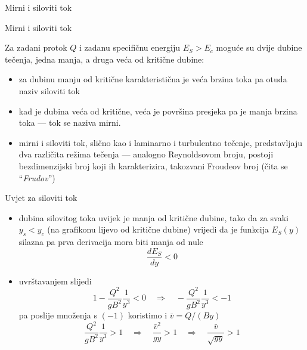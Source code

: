 \documentclass{beamer}
\begin{document}
\begin{frame}{Mirni i siloviti tok}

\begin{block}{Mirni i siloviti tok}

Za zadani protok $Q$ i zadanu specifičnu energiju $E_{S}>E_{c}$
moguće su dvije dubine tečenja, jedna manja, a druga veća od kritične
dubine:

\begin{itemize}
\item za dubinu manju od kritične karakteristična je veća brzina toka pa
otuda naziv \alert{siloviti tok}
\item kad je dubina veća od kritične, veća je površina presjeka pa je manja
brzina toka --- tok se naziva \alert{mirni}.
\end{itemize}
\end{block}
\begin{itemize}
\item mirni i siloviti tok, slično kao i laminarno i turbulentno tečenje,
predstavljaju dva različita režima tečenja --- analogno Reynoldsovom
broju, postoji bezdimenzijski broj koji ih karakterizira, takozvani
\alert{Froudeov broj} (čita se ``\emph{Frudov}'')
\end{itemize}
\end{frame}

\begin{frame}{Uvjet za siloviti tok}

\begin{itemize}
\item dubina silovitog toka uvijek je manja od kritične dubine, tako da
za svaki $y_{s}<y_{c}$ (na grafikonu lijevo od kritične dubine) vrijedi
da je funkcija $E_{S}(y)$ \alert{silazna} pa prva derivacija mora
biti manja od nule
\[
\frac{dE_{S}}{dy}<0
\]
\item uvrštavanjem slijedi
\[
1-\frac{Q^{2}}{gB^{2}}\frac{1}{y^{3}}<0\quad\Rightarrow\quad-\frac{Q^{2}}{gB^{2}}\frac{1}{y^{3}}<-1
\]
pa poslije množenja s $(-1)$ koristimo i $\bar{v}=Q/(By)$
\[
\frac{Q^{2}}{gB^{2}}\frac{1}{y^{3}}>1\quad\Rightarrow\quad\frac{\bar{v}^{2}}{gy}>1\quad\Rightarrow\quad\frac{\bar{v}}{\sqrt{gy}}>1
\]
\end{itemize}
\end{frame}
\end{document}

